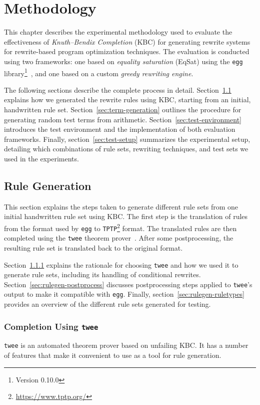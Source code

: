 \chapter{Methodology}
\label{chap:methods}

This chapter describes the experimental methodology used to evaluate the effectiveness of \textit{Knuth–Bendix Completion} (KBC) for generating rewrite systems for rewrite-based program optimization techniques. The evaluation is conducted using two frameworks: one based on \textit{equality saturation} (EqSat) using the \texttt{egg} library\footnote{Version 0.10.0}~\citep{Willsey_2021}, and one based on a custom \textit{greedy rewriting engine}.

The following sections describe the complete process in detail. Section~\ref{sec:rule-generation} explains how we generated the rewrite rules using KBC, starting from an initial, handwritten rule set. Section~\ref{sec:term-generation} outlines the procedure for generating random test terms from arithmetic. Section~\ref{sec:test-environment} introduces the test environment and the implementation of both evaluation frameworks. Finally, section~\ref{sec:test-setup} summarizes the experimental setup, detailing which combinations of rule sets, rewriting techniques, and test sets we used in the experiments.

\section{Rule Generation}
\label{sec:rule-generation}
This section explains the steps taken to generate different rule sets from one initial handwritten rule set using KBC. The first step is the translation of rules from the format used by \texttt{egg} to \texttt{TPTP}\footnote{\url{https://www.tptp.org/}} format. The translated rules are then completed using the \texttt{twee} theorem prover~\citep{twee}. After some postprocessing, the resulting rule set is translated back to the original format. 

Section~\ref{sec:rulegen-twee} explains the rationale for choosing \texttt{twee} and how we used it to generate rule sets, including its handling of conditional rewrites. Section~\ref{sec:rulegen-postprocess} discusses postprocessing steps applied to \texttt{twee}'s output to make it compatible with \texttt{egg}. Finally, section~\ref{sec:rulegen-ruletypes} provides an overview of the different rule sets generated for testing.

\subsection{Completion Using \texttt{twee}}
\label{sec:rulegen-twee}
\texttt{twee} is an automated theorem prover based on unfailing KBC. It has a number of features that make it convenient to use as a tool for rule generation. 

